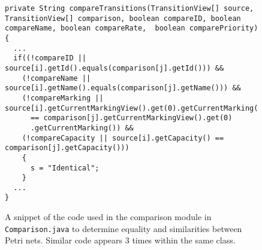 \begin{figure}[b]
\begin{center}
\begin{lstlisting}[frame=single]
private String compareTransitions(TransitionView[] source, TransitionView[] comparison, boolean compareID, boolean compareName, boolean compareRate,  boolean comparePriority) {
  ...
  if((!compareID || source[i].getId().equals(comparison[j].getId())) &&
    (!compareName || source[i].getName().equals(comparison[j].getName())) &&
    (!compareMarking || source[i].getCurrentMarkingView().get(0).getCurrentMarking()
      == comparison[j].getCurrentMarkingView().get(0)
      .getCurrentMarking()) &&
    (!compareCapacity || source[i].getCapacity() == comparison[j].getCapacity()))
    {
      s = "Identical";
    }
  ...
}
\end{lstlisting}


  
\caption{A snippet of the code used in the comparison module in 
            \texttt{Comparison.java} to determine equality and similarities between
            Petri nets. Similar code appears 3 times within the same class.}
\label{lst:identical}
\end{center}
\end{figure}